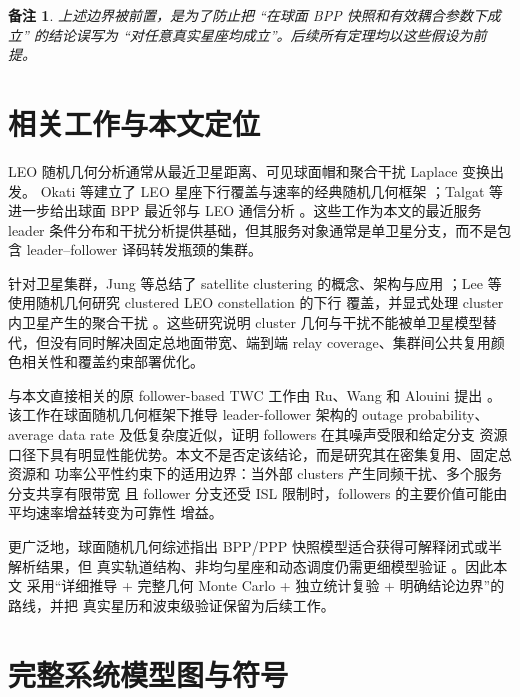 \documentclass[UTF8,a4paper,11pt]{ctexart}
\newtheorem{remark}{备注}[section]
\begin{document}
\begin{remark}
上述边界被前置，是为了防止把 ``在球面 BPP 快照和有效耦合参数下成立'' 的结论误写为
``对任意真实星座均成立''。后续所有定理均以这些假设为前提。
\end{remark}

\section{相关工作与本文定位}

LEO 随机几何分析通常从最近卫星距离、可见球面帽和聚合干扰 Laplace 变换出发。
Okati 等建立了 LEO 星座下行覆盖与速率的经典随机几何框架
\cite{okati2020downlink}；Talgat 等进一步给出球面 BPP 最近邻与 LEO 通信分析
\cite{talgat2020nearest,talgat2021stochastic}。这些工作为本文的最近服务 leader
条件分布和干扰分析提供基础，但其服务对象通常是单卫星分支，而不是包含 leader--follower
译码转发瓶颈的集群。

针对卫星集群，Jung 等总结了 satellite clustering 的概念、架构与应用
\cite{jung2023concept}；Lee 等使用随机几何研究 clustered LEO constellation 的下行
覆盖，并显式处理 cluster 内卫星产生的聚合干扰 \cite{lee2024clustered}。这些研究说明
cluster 几何与干扰不能被单卫星模型替代，但没有同时解决固定总地面带宽、端到端 relay
coverage、集群间公共复用颜色相关性和覆盖约束部署优化。

与本文直接相关的原 follower-based TWC 工作由 Ru、Wang 和 Alouini 提出
\cite{ru2026follower}。该工作在球面随机几何框架下推导 leader-follower 架构的 outage
probability、average data rate 及低复杂度近似，证明 followers 在其噪声受限和给定分支
资源口径下具有明显性能优势。本文不是否定该结论，而是研究其在密集复用、固定总资源和
功率公平性约束下的适用边界：当外部 clusters 产生同频干扰、多个服务分支共享有限带宽
且 follower 分支还受 ISL 限制时，followers 的主要价值可能由平均速率增益转变为可靠性
增益。

更广泛地，球面随机几何综述指出 BPP/PPP 快照模型适合获得可解释闭式或半解析结果，但
真实轨道结构、非均匀星座和动态调度仍需更细模型验证 \cite{wang2025survey}。因此本文
采用``详细推导 + 完整几何 Monte Carlo + 独立统计复验 + 明确结论边界''的路线，并把
真实星历和波束级验证保留为后续工作。

\section{完整系统模型图与符号}
\end{document}

